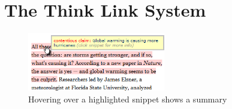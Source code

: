 \documentclass{chi2009}
\begin{document}
%

%

\section{The Think Link System}


\begin{figure}[tb]
	\begin{center}
	\includegraphics[width=6cm]{../screenshots/highlight_crop.png}
	\caption{Hovering over a highlighted snippet shows a summary}
	\label{highlight}
	\end{center}
\end{figure}
\end{document}

